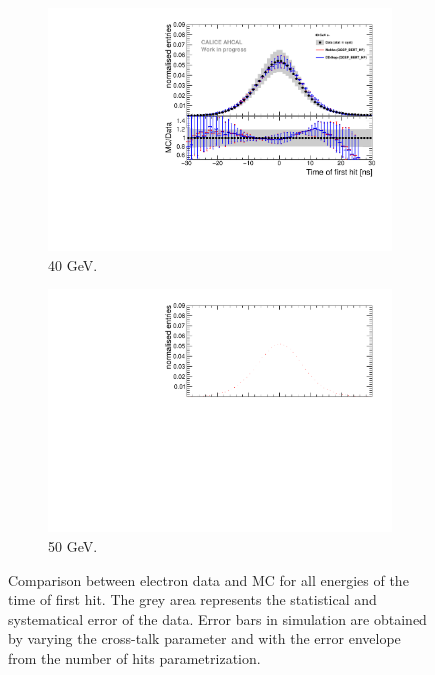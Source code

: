 \begin{figure}[htbp!]
\begin{subfigure}[t]{0.5\textwidth}
		\includegraphics[width=1\textwidth]{../Thesis_Plots/Timing/Electrons/Plots/Comparison_SimData_Electrons40GeV.pdf}
		\caption{40 GeV.}\label{fig:elec_sim_data_40GeV}
	\end{subfigure}
	\hfill
	\begin{subfigure}[t]{0.5\textwidth}
		\centering
		\includegraphics[width=1\textwidth]{../Thesis_Plots/Timing/Electrons/Plots/Comparison_SimData_Electrons50GeV.pdf}
		\caption{50 GeV.}\label{fig:elec_sim_data_50GeV}
	\end{subfigure}
	\caption{Comparison between electron data and MC for all energies of the time of first hit. The grey area represents the statistical and systematical error of the data. Error bars in simulation are obtained by varying the cross-talk parameter and with the error envelope from the number of hits parametrization.}
	\label{fig:sim_data_elec}
\end{figure}

